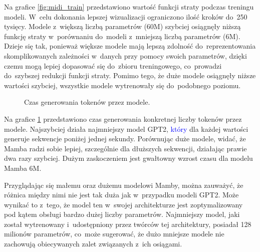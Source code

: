 \documentclass[data-science]{agh-wi} %
\begin{document}
Na grafice \ref*{fig:midi_train} przedstawiono wartość funkcji straty podczas treningu modeli. W~celu dokonania lepszej wizualizacji ograniczono ilość kroków do~250 tysięcy. Modele z~większą liczbą parametrów (60M) szybciej osiągnęły niższą funkcję straty w~porównaniu do~modeli z~mniejszą liczbą parametrów (6M). Dzieje się tak, ponieważ większe modele mają lepszą zdolność do~reprezentowania skomplikowanych zależności w~danych przy pomocy swoich parametrów, dzięki czemu mogą lepiej dopasować się do~zbioru treningowego, co~prowadzi do~szybszej redukcji funkcji straty. Pomimo tego, że duże modele osiągnęły niższe wartości szybciej, wszystkie modele wytrenowały się do~podobnego poziomu.

\begin{figure}
    \centering
    \caption{Czas generowania tokenów przez modele.}\label{fig:time_generate}
\end{figure}

Na grafice \ref*{fig:time_generate} przedstawiono czas generowania konkretnej liczby tokenów przez modele. Najszybciej działa najmniejszy model GPT2, \textcolor{blue}{który} dla każdej wartości generuje sekwencje poniżej jednej sekundy. Porównując duże modele, widać, że Mamba radzi sobie lepiej, szczególnie dla dłuższych sekwencji, działając prawie dwa razy szybciej. Dużym zaskoczeniem jest gwałtowny wzrost czasu dla modelu Mamba 6M.

Przyglądając się małemu oraz dużemu modelowi Mamby, można zauważyć, że różnica między nimi nie jest tak duża jak w~przypadku modeli GPT2. Może wynikać to z~tego, że model ten w~swojej architekturze jest zoptymalizowany pod kątem obsługi bardzo dużej liczby parametrów. Najmniejszy model, jaki został wytrenowany i~udostępniony przez twórców tej architektury, posiadał 128 milionów parametrów, co~może sugerować, że dużo mniejsze modele nie zachowują obiecywanych zalet związanych z~ich osiągami.
\end{document}
